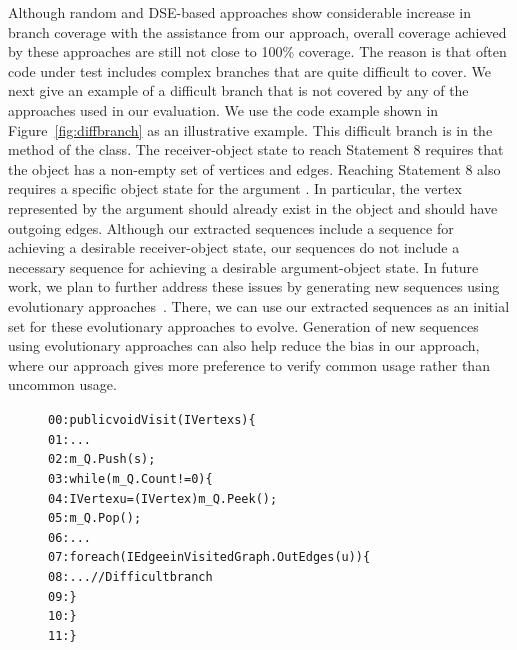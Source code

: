 \documentclass{sig-alternate}
\begin{document}
Although random and DSE-based approaches show considerable increase in branch coverage with the assistance from our approach, overall coverage achieved by these approaches are still not close to 100\% coverage. The reason is that often code under test includes complex branches that are quite difficult to cover. We next give an example of a difficult branch that is not covered by any of the approaches used in our evaluation. We use the code example shown in Figure~\ref{fig:diffbranch} as an illustrative example. This difficult branch is in the  method of the  class. The receiver-object state to reach Statement 8 requires that the  object has a non-empty set of vertices and edges. Reaching Statement 8 also requires a specific object state for the argument . In particular, the vertex represented by the argument  should already exist in the  object and should have outgoing edges. Although our extracted sequences include a sequence for achieving a desirable receiver-object state, our sequences do not include a necessary sequence for achieving a desirable argument-object state. In future work, we plan to further address these issues by generating new sequences using evolutionary approaches~\cite{tonella:etoc,  inkumsah08:improving}. There, we can use our extracted sequences as an initial set for these evolutionary approaches to evolve. Generation of new sequences using evolutionary approaches can also help reduce the bias in our approach, where our approach gives more preference to verify common usage rather than uncommon usage.

\begin{figure}[t]
\begin{CodeOut}
\begin{alltt}
00:public void Visit(IVertex s) \{
01:\hspace*{0.1in}...
02:\hspace*{0.1in}m\_Q.Push(s);
03:\hspace*{0.1in}while (m\_Q.Count != 0) \{
04:\hspace*{0.2in}IVertex u = (IVertex)m\_Q.Peek(); 
05:\hspace*{0.2in}m\_Q.Pop();
06:\hspace*{0.2in}...
07:\hspace*{0.2in}foreach(IEdge e in VisitedGraph.OutEdges(u)) \{ 
08:\hspace*{0.3in}...		//Difficult branch
09:\hspace*{0.2in}\} 
10:\hspace*{0.1in}\}
11:\}
\end{alltt}
\end{CodeOut}\vspace*{-5ex}
\vspace*{-5ex}
\end{figure}
\end{document}
